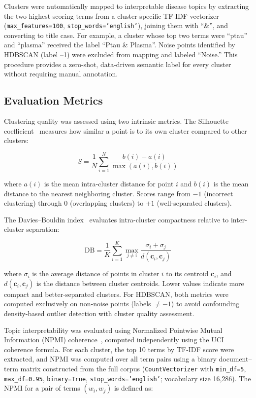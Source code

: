 \documentclass[a4paper,fleqn]{cas-dc}
\begin{document}
Clusters were automatically mapped to interpretable disease topics by extracting the two highest-scoring terms from a cluster-specific TF-IDF vectorizer (\texttt{max\_features=100}, \texttt{stop\_words='english'}), joining them with ``\&'', and converting to title case. For example, a cluster whose top two terms were ``ptau'' and ``plasma'' received the label ``Ptau \& Plasma''. Noise points identified by HDBSCAN (label --1) were excluded from mapping and labeled ``Noise.'' This procedure provides a zero-shot, data-driven semantic label for every cluster without requiring manual annotation.

\subsection{Evaluation Metrics}

Clustering quality was assessed using two intrinsic metrics. The Silhouette coefficient~\cite{ref26} measures how similar a point is to its own cluster compared to other clusters:

\begin{equation}
S = \frac{1}{N} \sum_{i=1}^{N} \frac{b(i) - a(i)}{\max(a(i), b(i))}
\end{equation}

where $a(i)$ is the mean intra-cluster distance for point $i$ and $b(i)$ is the mean distance to the nearest neighboring cluster. Scores range from $-1$ (incorrect clustering) through $0$ (overlapping clusters) to $+1$ (well-separated clusters).

The Davies--Bouldin index~\cite{ref27} evaluates intra-cluster compactness relative to inter-cluster separation:

\begin{equation}
\text{DB} = \frac{1}{K} \sum_{i=1}^{K} \max_{j \neq i} \frac{\sigma_i + \sigma_j}{d(\mathbf{c}_i, \mathbf{c}_j)}
\end{equation}

where $\sigma_i$ is the average distance of points in cluster $i$ to its centroid $\mathbf{c}_i$, and $d(\mathbf{c}_i, \mathbf{c}_j)$ is the distance between cluster centroids. Lower values indicate more compact and better-separated clusters. For HDBSCAN, both metrics were computed exclusively on non-noise points (labels $\neq -1$) to avoid confounding density-based outlier detection with cluster quality assessment.

Topic interpretability was evaluated using Normalized Pointwise Mutual Information (NPMI) coherence~\cite{ref28}, computed independently using the UCI coherence formula. For each cluster, the top 10 terms by TF-IDF score were extracted, and NPMI was computed over all term pairs using a binary document--term matrix constructed from the full corpus (\texttt{CountVectorizer} with \texttt{min\_df=5}, \texttt{max\_df=0.95}, \texttt{binary=True}, \texttt{stop\_words='english'}; vocabulary size 16,286). The NPMI for a pair of terms $(w_i, w_j)$ is defined as:
\end{document}
